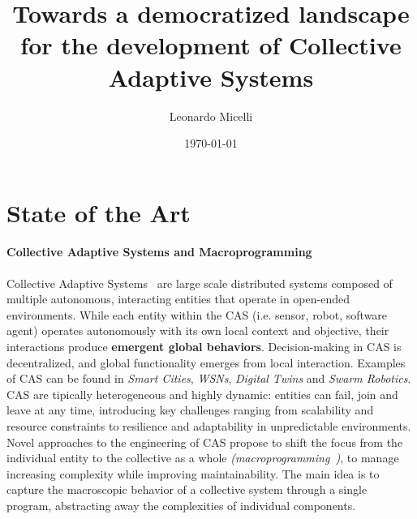 \documentclass[12pt]{article}
\begin{document}
\title{Towards a democratized landscape for the development of Collective Adaptive Systems}
\author{Leonardo Micelli}
\date{\today}
\maketitle

\noindent


\newpage
\setcounter{tocdepth}{2}

\setlength{\parindent}{0em}
\setlength{\parskip}{1em}

\section{State of the Art}
\paragraph{\textbf{Collective Adaptive Systems and Macroprogramming}} Collective Adaptive Systems~\cite{ferscha2015collective} are large scale distributed systems composed of multiple autonomous, 
interacting entities that operate in open-ended environments. While each entity within the CAS (i.e. sensor, robot, software agent) operates autonomously with its own local context and objective, their interactions
produce \textbf{emergent global behaviors}. Decision-making in CAS is decentralized, and global functionality emerges from local interaction. Examples of CAS can be found in \textit{Smart Cities}, \textit{WSNs}, \textit{Digital Twins} and \textit{Swarm Robotics}.
CAS are tipically heterogeneous and highly dynamic: entities can fail, join and leave at any time, introducing key challenges ranging from scalability and resource constraints to resilience and adaptability in
unpredictable environments. Novel approaches to the engineering of CAS propose to shift the focus from the individual entity to the collective as a whole \textit{(macroprogramming~\cite{10.1145/3579353})}, to manage increasing complexity while
improving maintainability. The main idea is to capture the macroscopic behavior of a collective system through a single program, abstracting away the complexities of individual components.
\end{document}

